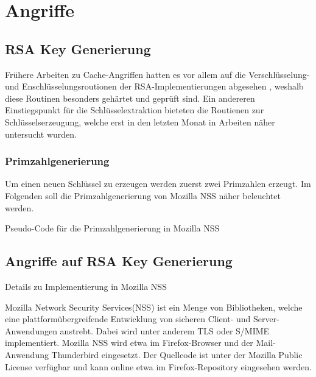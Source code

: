 \chapter{Angriffe}
\label{chapter:results}

\section{RSA Key Generierung}

Frühere Arbeiten zu Cache-Angriffen hatten es vor allem auf die Verschlüsselung- und Enschlüsselungsroutionen der RSA-Implementierungen abgesehen \cite{}, weshalb diese Routinen besonders gehärtet und geprüft sind.
Ein andereren Einstiegspunkt für die Schlüsselextraktion bieteten die Routienen zur Schlüsselserzeugung, welche erst in den letzten Monat in Arbeiten näher untersucht wurden.

\subsection{Primzahlgenerierung}

Um einen neuen Schlüssel zu erzeugen werden zuerst zwei Primzahlen erzeugt. Im Folgenden soll die Primzahlgenerierung von Mozilla NSS näher beleuchtet werden.

\begin{algorithm}[h]
\DontPrintSemicolon
\caption{Pseudo-Code für die Primzahlgenerierung in Mozilla NSS}
\label{alg:primeGenerationNSS}


\end{algorithm}


\section{Angriffe auf RSA Key Generierung}

Details zu Implementierung in Mozilla NSS

Mozilla Network Security Services(NSS) ist ein Menge von Bibliotheken, welche eine plattformübergreifende Entwicklung von sicheren Client- und Server-Anwendungen anstrebt. Dabei wird unter anderem TLS oder S/MIME implementiert. Mozilla NSS wird etwa im Firefox-Browser und der Mail-Anwendung Thunderbird eingesetzt.
Der Quellcode ist unter der Mozilla Public License verfügbar und kann online etwa im Firefox-Repository \cite{MozillaDXR} eingesehen werden.


